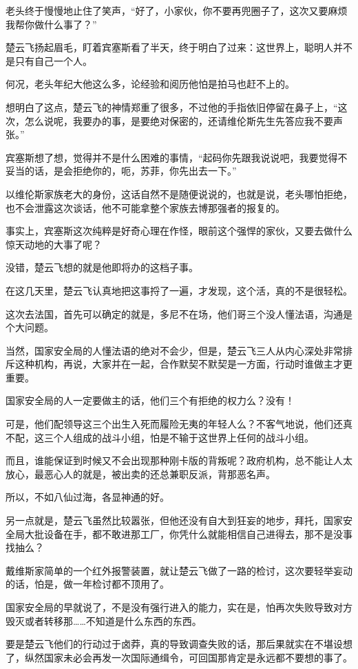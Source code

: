 老头终于慢慢地止住了笑声，“好了，小家伙，你不要再兜圈子了，这次又要麻烦我帮你做什么事了？”

楚云飞扬起眉毛，盯着宾塞斯看了半天，终于明白了过来：这世界上，聪明人并不是只有自己一个人。

何况，老头年纪大他这么多，论经验和阅历他怕是拍马也赶不上的。

想明白了这点，楚云飞的神情郑重了很多，不过他的手指依旧停留在鼻子上，“这次，怎么说呢，我要办的事，是要绝对保密的，还请维伦斯先生先答应我不要声张。”

宾塞斯想了想，觉得并不是什么困难的事情，“起码你先跟我说说吧，我要觉得不妥当的话，是会拒绝你的，呃，苏菲，你先出去一下。”

以维伦斯家族老大的身份，这话自然不是随便说说的，也就是说，老头哪怕拒绝，也不会泄露这次谈话，他不可能拿整个家族去博那强者的报复的。

事实上，宾塞斯这次纯粹是好奇心理在作怪，眼前这个强悍的家伙，又要去做什么惊天动地的大事了呢？

没错，楚云飞想的就是他即将办的这档子事。

在这几天里，楚云飞认真地把这事捋了一遍，才发现，这个活，真的不是很轻松。

这次去法国，首先可以确定的就是，多尼不在场，他们哥三个没人懂法语，沟通是个大问题。

当然，国家安全局的人懂法语的绝对不会少，但是，楚云飞三人从内心深处非常排斥这种机构，再说，大家并在一起，合作默契不默契是一方面，行动时谁做主才更重要。

国家安全局的人一定要做主的话，他们三个有拒绝的权力么？没有！

可是，他们配领导这三个出生入死而履险无夷的年轻人么？不客气地说，他们还真不配，这三个人组成的战斗小组，怕是不输于这世界上任何的战斗小组。

而且，谁能保证到时候又不会出现那种刚卡版的背叛呢？政府机构，总不能让人太放心，最恶心人的就是，被出卖的还总兼职反派，背那恶名声。

所以，不如八仙过海，各显神通的好。

另一点就是，楚云飞虽然比较嚣张，但他还没有自大到狂妄的地步，拜托，国家安全局大批设备在手，都不敢进那工厂，你凭什么就能相信自己进得去，那不是没事找抽么？

戴维斯家简单的一个红外报警装置，就让楚云飞做了一路的检讨，这次要轻举妄动的话，怕是，做一年检讨都不顶用了。

国家安全局的早就说了，不是没有强行进入的能力，实在是，怕再次失败导致对方毁灭或者转移那……不知道是什么东西的东西。

要是楚云飞他们的行动过于卤莽，真的导致调查失败的话，那后果就实在不堪设想了，纵然国家未必会再发一次国际通缉令，可回国那肯定是永远都不要想的事了。

